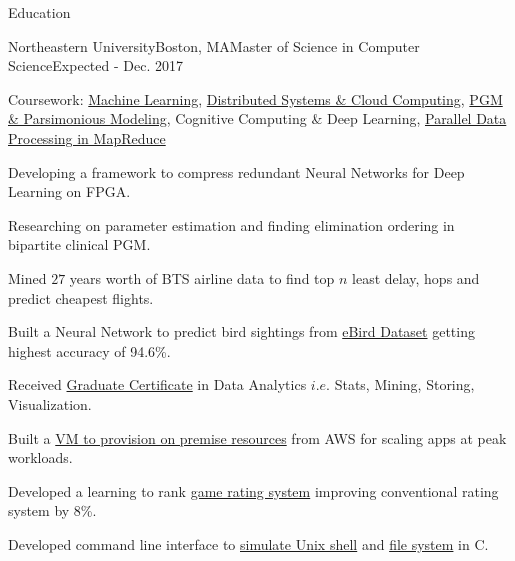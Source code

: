 \documentclass{resume} %
\begin{document}

\begin{rSection}{Education}

\begin{rSubsection}{Northeastern University}{Boston, MA}{Master of Science in Computer Science}{Expected - Dec. 2017}
\item Coursework: \href{http://www.ccs.neu.edu/home/vip/teach/MLcourse/html/}{Machine Learning}, \href{https://okrieg.github.io/EC500/index-spring-2016.html}{Distributed Systems \& Cloud Computing}, \href{http://www.ccs.neu.edu/home/eelhami/courses_nu_cs7180.htm}{PGM \& Parsimonious \mbox{Modeling}}, Cognitive Computing \& Deep Learning, \href{http://www.ccs.neu.edu/home/mirek/classes/2012-F-CS6240/}{Parallel Data Processing in MapReduce}
\item Developing a framework to compress redundant Neural Networks for Deep Learning on FPGA.
\item Researching on parameter estimation and finding elimination ordering in bipartite clinical PGM.
\item Mined $27$ years worth of BTS airline data to find top $n$ least delay, hops and predict cheapest flights.
\item Built a Neural Network to predict bird sightings from \href{http://www.ccs.neu.edu/home/mirek/papers/ebird-ref-data.pdf}{eBird Dataset} getting highest accuracy of 94.6\%.
\item Received \href{http://www.northeastern.edu/data-analytics/data-science-certificate/}{Graduate Certificate} in Data Analytics $i.e.$ Stats, Mining, Storing, Visualization.
\item Built a \href{https://github.com/singhay/ms-courses-code/tree/master/CS7680-Cloud-Computing-Distributed-Systems}{VM to provision on premise resources} from AWS for scaling apps at peak workloads.
\item Developed a learning to rank \href{https://github.com/singhay/ms-courses-code/tree/master/CS6140-Machine-Learning}{game rating system} improving conventional rating system by 8\%.
\item Developed command line interface to \href{https://github.com/singhay/ms-courses-code/tree/master/CS5600-Computer-Systems/team-05-hw1-master}{simulate Unix shell} and \href{https://github.com/singhay/ms-courses-code/tree/master/CS5600-Computer-Systems/team-05-hw2-master}{file system} in C.
\end{rSubsection}


\end{rSection}
\end{document}

